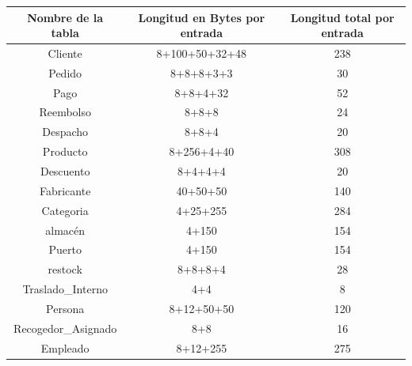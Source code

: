 \documentclass[10pt, a4paper,openany]{report}
\begin{document}
\begin{table}[h]
	\label{tab:Tamaño de las tablas}
	\begin{center}
		\begin{tabular}[c]{|c|c|c|}
			\hline
			\multicolumn{1}{|c|}{\textbf{Nombre de la tabla}}          &
			\multicolumn{1}{c}{\textbf{Longitud en Bytes por entrada}} &
			\multicolumn{1}{|c|}{\textbf{Longitud total por entrada}}                         \\
			\hline
			Cliente                                                    & 8+100+50+32+48 & 238 \\
			\hline
			Pedido                                                     & 8+8+8+3+3      & 30  \\
			\hline
			Pago                                                       & 8+8+4+32       & 52  \\
			\hline
			Reembolso                                                  & 8+8+8          & 24  \\
			\hline
			Despacho                                                   & 8+8+4          & 20  \\
			\hline
			Producto                                                   & 8+256+4+40     & 308 \\
			\hline
			Descuento                                                  & 8+4+4+4        & 20  \\
			\hline
			Fabricante                                                 & 40+50+50       & 140 \\
			\hline
			Categoria                                                  & 4+25+255       & 284 \\
			\hline
			almacén                                                    & 4+150          & 154 \\
			\hline
			Puerto                                                     & 4+150          & 154 \\
			\hline
			restock                                                    & 8+8+8+4        & 28  \\
			\hline
			Traslado\_Interno                                          & 4+4            & 8   \\
			\hline
			Persona                                                    & 8+12+50+50     & 120 \\
			\hline
			Recogedor\_Asignado                                        & 8+8            & 16  \\
			\hline
			Empleado                                                   & 8+12+255       & 275 \\

\end{tabular}
\end{center}
\end{table}
\end{document}
